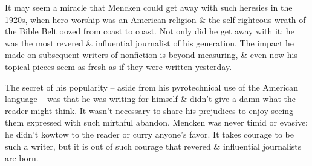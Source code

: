 \documentclass{article}
\begin{document}
It may seem a miracle that Mencken could get away with such heresies in the 1920s, when hero worship was an American religion \& the self-righteous wrath of the Bible Belt oozed from coast to coast. Not only did he get away with it; he was the most revered \& influential journalist of his generation. The impact he made on subsequent writers of nonfiction is beyond measuring, \& even now his topical pieces seem as fresh as if they were written yesterday.

The secret of his popularity -- aside from his pyrotechnical use of the American language -- was that he was writing for himself \& didn't give a damn what the reader might think. It wasn't necessary to share his prejudices to enjoy seeing them expressed with such mirthful abandon. Mencken was never timid or evasive; he didn't kowtow to the reader or curry anyone's favor. It takes courage to be such a writer, but it is out of such courage that revered \& influential journalists are born.
\end{document}
